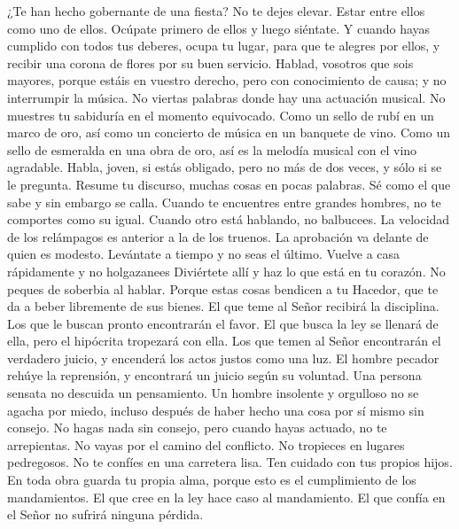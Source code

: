  ¿Te han hecho gobernante de una fiesta? No te dejes
elevar. Estar entre ellos como uno de ellos. Ocúpate primero de ellos y
luego siéntate.  Y cuando hayas cumplido con todos tus
deberes, ocupa tu lugar, para que te alegres por ellos, y recibir una
corona de flores por su buen servicio.  Hablad, vosotros
que sois mayores, porque estáis en vuestro derecho, pero con
conocimiento de causa; y no interrumpir la música.  No
viertas palabras donde hay una actuación musical. No muestres tu
sabiduría en el momento equivocado.  Como un sello de rubí
en un marco de oro, así como un concierto de música en un banquete de
vino.  Como un sello de esmeralda en una obra de oro, así
es la melodía musical con el vino agradable.  Habla,
joven, si estás obligado, pero no más de dos veces, y sólo si se le
pregunta.  Resume tu discurso, muchas cosas en pocas
palabras. Sé como el que sabe y sin embargo se calla. 
Cuando te encuentres entre grandes hombres, no te comportes como su
igual. Cuando otro está hablando, no balbucees.  La
velocidad de los relámpagos es anterior a la de los truenos. La
aprobación va delante de quien es modesto.  Levántate a
tiempo y no seas el último. Vuelve a casa rápidamente y no holgazanees
 Diviértete allí y haz lo que está en tu corazón. No
peques de soberbia al hablar.  Porque estas cosas
bendicen a tu Hacedor, que te da a beber libremente de sus bienes.
 El que teme al Señor recibirá la disciplina. Los que le
buscan pronto encontrarán el favor.  El que busca la ley
se llenará de ella, pero el hipócrita tropezará con ella.
 Los que temen al Señor encontrarán el verdadero juicio,
y encenderá los actos justos como una luz.  El hombre
pecador rehúye la reprensión, y encontrará un juicio según su voluntad.
 Una persona sensata no descuida un pensamiento. Un
hombre insolente y orgulloso no se agacha por miedo, incluso después de
haber hecho una cosa por sí mismo sin consejo.  No hagas
nada sin consejo, pero cuando hayas actuado, no te arrepientas.
 No vayas por el camino del conflicto. No tropieces en
lugares pedregosos.  No te confíes en una carretera lisa.
 Ten cuidado con tus propios hijos.  En
toda obra guarda tu propia alma, porque esto es el cumplimiento de los
mandamientos.  El que cree en la ley hace caso al
mandamiento. El que confía en el Señor no sufrirá ninguna pérdida.

